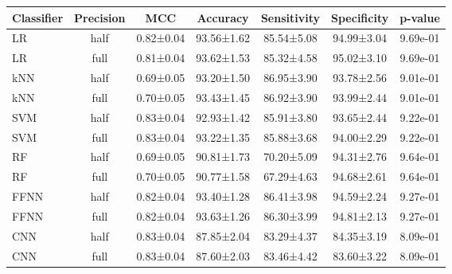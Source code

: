 \begin{tabular}{lcccccc}
\toprule
Classifier & Precision &       MCC &   Accuracy & Sensitivity & Specificity &  p-value \\
\midrule
        LR &      half & 0.82±0.04 & 93.56±1.62 &  85.54±5.08 &  94.99±3.04 & 9.69e-01 \\
        LR &      full & 0.81±0.04 & 93.62±1.53 &  85.32±4.58 &  95.02±3.10 & 9.69e-01 \\
       kNN &      half & 0.69±0.05 & 93.20±1.50 &  86.95±3.90 &  93.78±2.56 & 9.01e-01 \\
       kNN &      full & 0.70±0.05 & 93.43±1.45 &  86.92±3.90 &  93.99±2.44 & 9.01e-01 \\
       SVM &      half & 0.83±0.04 & 92.93±1.42 &  85.91±3.80 &  93.65±2.44 & 9.22e-01 \\
       SVM &      full & 0.83±0.04 & 93.22±1.35 &  85.88±3.68 &  94.00±2.29 & 9.22e-01 \\
        RF &      half & 0.69±0.05 & 90.81±1.73 &  70.20±5.09 &  94.31±2.76 & 9.64e-01 \\
        RF &      full & 0.70±0.05 & 90.77±1.58 &  67.29±4.63 &  94.68±2.61 & 9.64e-01 \\
      FFNN &      half & 0.82±0.04 & 93.40±1.28 &  86.41±3.98 &  94.59±2.24 & 9.27e-01 \\
      FFNN &      full & 0.82±0.04 & 93.63±1.26 &  86.30±3.99 &  94.81±2.13 & 9.27e-01 \\
       CNN &      half & 0.83±0.04 & 87.85±2.04 &  83.29±4.37 &  84.35±3.19 & 8.09e-01 \\
       CNN &      full & 0.83±0.04 & 87.60±2.03 &  83.46±4.42 &  83.60±3.22 & 8.09e-01 \\
\bottomrule
\end{tabular}
